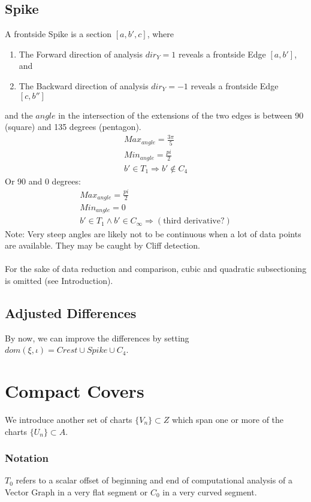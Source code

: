 \documentclass{report}
\begin{document}
\subsection{Spike}
A frontside Spike is a section $[a,b',c]$, where
\begin{enumerate}
\item The Forward direction of analysis $dir_{Y}=1$ reveals a frontside Edge $[a,b']$, and
\item The Backward direction of analysis $dir_{Y}=-1$ reveals a frontside Edge $[c,b'']$ 
\end{enumerate}
and the $angle$ in the intersection of the extensions of the two edges is between 90 (square) and 135 degrees (pentagon).\\
\begin{align}
Max_{angle}=\frac{3\pi}{5}\\
Min_{angle}=\frac{pi}{2}\\
b' \in T_{1} \Rightarrow b' \not\in C_{4}
\end{align}
Or 90 and 0 degrees:
\begin{align}
Max_{angle}=\frac{pi}{2}\\
Min_{angle}=0\\
b' \in T_{1} \land b' \in C_{\infty} \Rightarrow (\text{third derivative?})
\end{align}
Note: Very steep angles are likely not to be continuous when a lot of data points are available. They may be caught by Cliff detection.\\\\
For the sake of data reduction and comparison, cubic and quadratic subsectioning is omitted (see Introduction).

\subsection*{Adjusted Differences}
By now, we can improve the differences by setting $dom(\xi,\iota)=Crest \cup Spike \cup C_{4}$.

\section{Compact Covers}
We introduce another set of charts $\{V_{n}\} \subset Z$ which span one or more of the charts $\{U_{n}\} \subset A$.
\subsubsection*{Notation}
$T_{0}$ refers to a scalar offset of beginning and end of computational analysis of a Vector Graph in a very flat segment or $C_{0}$ in a very curved segment.
\end{document}
